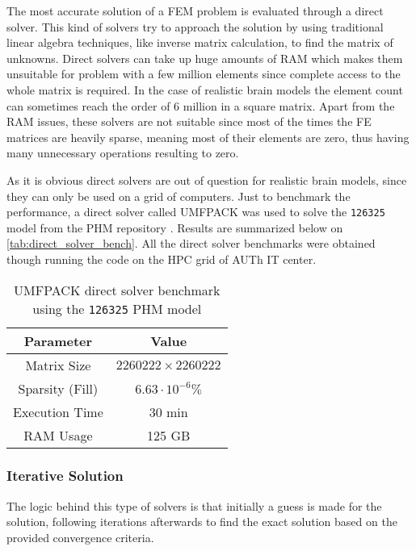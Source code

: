 The most accurate solution of a \gls{FEM} problem is evaluated through a direct solver. This kind of solvers try to approach the solution by using traditional linear algebra techniques, like inverse matrix calculation, to find the matrix of unknowns. Direct solvers can take up huge amounts of \gls{RAM} which makes them unsuitable for problem with a few million elements since complete access to the whole matrix is required. In the case of realistic brain models the element count can sometimes reach the order of 6 million in a square matrix. Apart from the \gls{RAM} issues, these solvers are not suitable since most of the times the \gls{FE} matrices are heavily sparse, meaning most of their elements are zero, thus having many unnecessary operations resulting to zero.

As it is obvious direct solvers are out of question for realistic brain models, since they can only be used on a grid of computers. Just to benchmark the performance, a direct solver called \gls{UMFPACK} \cite{Davis2004_umfpack} was used to solve the \texttt{126325} model from the \gls{PHM} repository \cite{ErikG.Lee2016}. Results are summarized below on \autoref{tab:direct_solver_bench}. All the direct solver benchmarks were obtained though running the code on the \gls{HPC} grid of \gls{AUTh} \gls{IT} center.

\begin{table}[!ht]
	\centering
	\caption{\gls{UMFPACK} direct solver benchmark using the \texttt{126325} \gls{PHM} model}
	\label{tab:direct_solver_bench}
	\begin{tabular}{|c|c|}
		\hline
		\rowcolor[HTML]{C0C0C0} 
		\textbf{Parameter} & \textbf{Value} \\ \hline
		Matrix Size & $2260222\times 2260222$ \\ \hline
		Sparsity (Fill) & $6.63\cdot 10^{-6}\%$ \\ \hline
		Execution Time & 30 min \\ \hline
		RAM Usage & 125 GB \\ \hline
	\end{tabular}
\end{table}

\subsubsection{Iterative Solution}
\label{subsec:iterative_solvers}

The logic behind this type of solvers is that initially a guess is made for the solution, following iterations afterwards to find the exact solution based on the provided convergence criteria.

